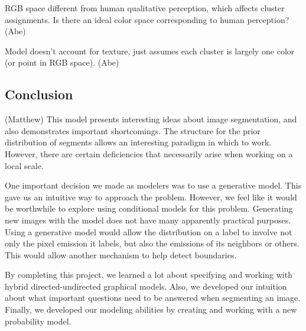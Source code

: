\documentclass[12pt]{article}
\begin{document}
RGB space different from human qualitative perception, which affects cluster assignments.
Is there an ideal color space corresponding to human perception? (Abe)

Model doesn't account for texture, just assumes each cluster is largely one color (or point 
in RGB space). (Abe)


\subsection*{Conclusion} (Matthew)
This model presents interesting ideas about image segmentation, and also
demonstrates important shortcomings. The structure for the prior distribution
of segments allows an interesting paradigm in which to work. However, there are
certain deficiencies that necessarily arise when working on a local scale.

One important decision we made as modelers was to use a generative model. This
gave us an intuitive way to approach the problem. However, we feel like it
would be worthwhile to explore using conditional models for this problem.
Generating new images with the model does not have many apparently practical
purposes. Using a generative model would allow the distribution on a label to
involve not only the pixel emission it labels, but also the emissions of its
neighbors or others. This would allow another mechanism to help detect
boundaries.

By completing this project, we learned a lot about specifying and working with
hybrid directed-undirected graphical models. Also, we developed our intuition
about what important questions need to be answered when segmenting an image.
Finally, we developed our modeling abilities by creating and working with a new
probability model.
\end{document}
